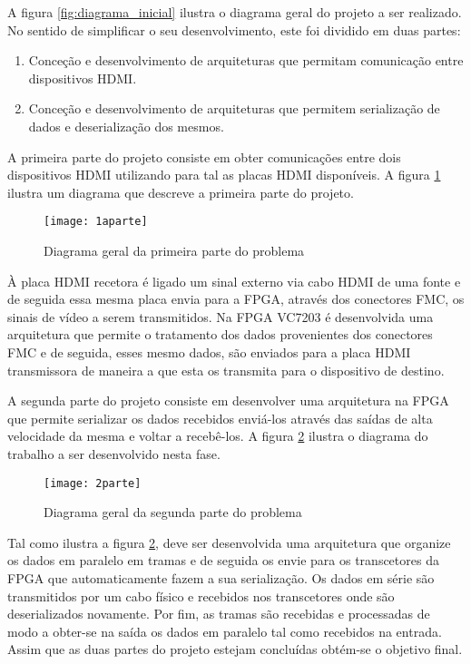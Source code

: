 A figura \ref{fig:diagrama_inicial}  ilustra o diagrama geral do projeto a ser realizado. No sentido de simplificar o seu desenvolvimento, este foi dividido em duas partes:
\begin{enumerate}
	\item Conceção e desenvolvimento de arquiteturas que permitam comunicação entre dispositivos HDMI.
	\item Conceção e desenvolvimento de arquiteturas que permitem serialização de dados e deserialização dos mesmos.
\end{enumerate}

A primeira parte do projeto consiste em obter comunicações entre dois dispositivos HDMI utilizando para tal as placas HDMI disponíveis. A figura \ref{fig:1parte_projeto} ilustra um diagrama que descreve a primeira parte do projeto.
\begin{figure}[h!]
	\begin{center}
		\leavevmode
		\texttt{[image: 1aparte]}
		\caption{Diagrama geral da primeira parte do problema}
		\label{fig:1parte_projeto}
	\end{center}
\end{figure}

À placa HDMI recetora é ligado um sinal externo via cabo HDMI de uma fonte e de seguida essa mesma placa envia para a FPGA, através dos conectores FMC, os sinais de vídeo a serem transmitidos. Na FPGA VC7203 é desenvolvida uma arquitetura que permite o tratamento dos dados provenientes dos conectores FMC e de seguida, esses mesmo dados, são enviados para a placa HDMI transmissora de maneira a que esta os transmita para o dispositivo de destino.

A segunda parte do projeto consiste em desenvolver uma arquitetura na FPGA que permite serializar os dados recebidos enviá-los através das saídas de alta velocidade da mesma e voltar a recebê-los. A figura \ref{fig:2parte_projeto} ilustra o diagrama do trabalho a ser desenvolvido nesta fase.

\begin{figure}[h!]
	\begin{center}
		\leavevmode
		\texttt{[image: 2parte]}
		\caption{Diagrama geral da segunda parte do problema}
		\label{fig:2parte_projeto}
	\end{center}
\end{figure}

Tal como ilustra a figura \ref{fig:2parte_projeto}, deve ser desenvolvida uma arquitetura que organize os dados em paralelo em tramas e de seguida os envie para os transcetores da FPGA que automaticamente fazem a sua serialização. Os dados em série são transmitidos por um cabo físico e recebidos nos transcetores onde são deserializados novamente. Por fim, as tramas são recebidas e processadas de modo a obter-se na saída os dados em paralelo tal como recebidos na entrada. Assim que as duas partes do projeto estejam concluídas obtém-se o objetivo final.

